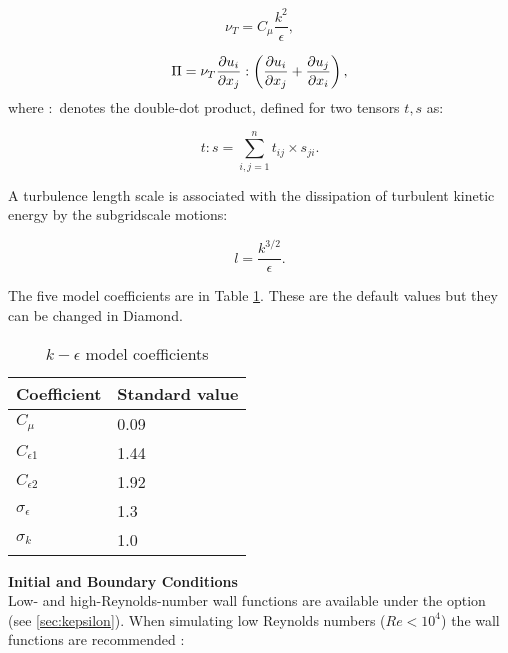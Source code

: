 \begin{equation}\label{nut}
\nu_T = C_\mu \frac{k^2}{\epsilon},
\end{equation}

\begin{equation}\label{Pi2}
\Pi = \nu_T \ppx[x_j]{u_i} : \left ( \ppx[x_j]{u_i} + \ppx[x_i]{u_j} \right ),
\end{equation}
where $:$ denotes the double-dot product, defined for two tensors $t, s$ as:

\begin{equation}\label{doubledot}
t:s = \sum_{i,j=1}^{n} t_{ij} \times s_{ji}.
\end{equation}

A turbulence length scale is associated with the dissipation of turbulent kinetic energy by the subgridscale motions:

\begin{equation}\label{lengthscale}
l = \frac{k^{3/2}}{\epsilon}.
\end{equation}

The five model coefficients are in Table \ref{tab:kepsco}. These are the default values but they can be changed in Diamond.

\begin{table}[hb]
\begin{center}
\begin{tabular}{ll}\hline
Coefficient & Standard value \\ \hline
$C_\mu$ & 0.09 \\
$C_{\epsilon1}$ & 1.44 \\
$C_{\epsilon2}$ & 1.92 \\
$\sigma_\epsilon$ & 1.3 \\
$\sigma_k$ & 1.0 \\ \hline
\end{tabular}
\end{center}
\caption{$k-\epsilon$ model coefficients}
\label{tab:kepsco}
\end{table}

\par{\textbf{Initial and Boundary Conditions}\\}
Low- and high-Reynolds-number wall functions are available under the option \linebreak {} (see \ref{sec:kepsilon}). When simulating low Reynolds numbers ($Re<10^4$) the  wall functions are recommended \citep{wilcox1998turbulence}:


